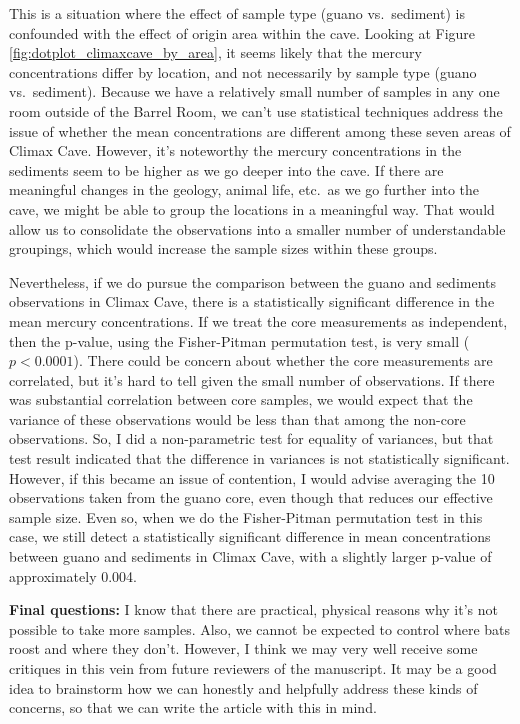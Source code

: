 \documentclass[11pt]{article}
\begin{document}
This is a situation where the effect of sample type (guano
vs.\ sediment) is confounded with the effect of origin area within the
cave.  Looking at Figure \ref{fig:dotplot_climaxcave_by_area}, it
seems likely that the mercury concentrations differ by location, and
not necessarily by sample type (guano vs.\ sediment).  Because we have
a relatively small number of samples in any one room outside of the
Barrel Room, we can't use statistical techniques address the issue of
whether the mean concentrations are different among these seven areas
of Climax Cave.  However, it's noteworthy the mercury concentrations
in the sediments seem to be higher as we go deeper into the cave.  If
there are meaningful changes in the geology, animal life, etc.\ as we
go further into the cave, we might be able to group the locations in a
meaningful way.  That would allow us to consolidate the observations
into a smaller number of understandable groupings, which would
increase the sample sizes within these groups.

Nevertheless, if we do pursue the comparison between the guano and
sediments observations in Climax Cave, there is a statistically
significant difference in the mean mercury concentrations.  If we
treat the core measurements as independent, then the p-value, using
the Fisher-Pitman permutation test, is very small ($p < 0.0001$).
There could be concern about whether the core measurements are
correlated, but it's hard to tell given the small number of
observations.  If there was substantial correlation between core
samples, we would expect that the variance of these observations would
be less than that among the non-core observations.  So, I did a
non-parametric test for equality of variances, but that test result
indicated that the difference in variances is not statistically
significant.  However, if this became an issue of contention, I would
advise averaging the 10 observations taken from the guano core, even
though that reduces our effective sample size.  Even so, when we do
the Fisher-Pitman permutation test in this case, we still detect a
statistically significant difference in mean concentrations between
guano and sediments in Climax Cave, with a slightly larger p-value of
approximately 0.004.


\vspace{0.2in}


\noindent \textbf{Final questions:} I know that there are practical,
physical reasons why it's not possible to take more samples.  Also, we
cannot be expected to control where bats roost and where they don't.
However, I think we may very well receive some critiques in this vein
from future reviewers of the manuscript.  It may be a good idea to
brainstorm how we can honestly and helpfully address these kinds of
concerns, so that we can write the article with this in mind.
\end{document}
